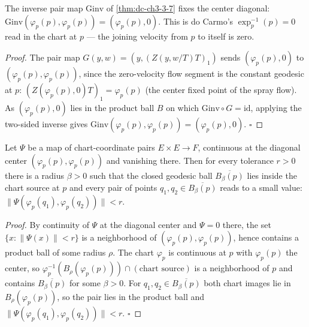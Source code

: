 \begin{lemma}
  \label{lem:dc-ch3-4-2-invdiagonal}
  \leanok
  The inverse pair map $\mathrm{Ginv}$ of \cref{thm:dc-ch3-3-7} fixes the center
  diagonal: $\mathrm{Ginv}(\varphi_p(p),\varphi_p(p))=(\varphi_p(p),0)$. This is
  do Carmo's $\exp_p^{-1}(p)=0$ read in the chart at $p$ — the joining velocity
  from $p$ to itself is zero.
\end{lemma}
\begin{proof}
  \leanok
  The pair map $G(y,w)=(y,(Z(y,w/T)T)_1)$ sends $(\varphi_p(p),0)$ to
  $(\varphi_p(p),\varphi_p(p))$, since the zero-velocity flow segment is the
  constant geodesic at $p$: $(Z(\varphi_p(p),0)T)_1=\varphi_p(p)$ (the center
  fixed point of the spray flow). As $(\varphi_p(p),0)$ lies in the product ball
  $B$ on which $\mathrm{Ginv}\circ G=\mathrm{id}$, applying the two-sided inverse
  gives $\mathrm{Ginv}(\varphi_p(p),\varphi_p(p))=(\varphi_p(p),0)$. $\square$
\end{proof}

\begin{lemma}
  \label{lem:dc-ch3-4-2-pairsmall}
  \leanok
  Let $\Psi$ be a map of chart-coordinate pairs $E\times E\to F$, continuous at the
  diagonal center $(\varphi_p(p),\varphi_p(p))$ and vanishing there. Then for every
  tolerance $r>0$ there is a radius $\beta>0$ such that the closed geodesic ball
  $\overline{B_\beta(p)}$ lies inside the chart source at $p$ and every pair of
  points $q_1,q_2\in\overline{B_\beta(p)}$ reads to a small value:
  $\|\Psi(\varphi_p(q_1),\varphi_p(q_2))\|<r$.
\end{lemma}
\begin{proof}
  \leanok
  By continuity of $\Psi$ at the diagonal center and $\Psi=0$ there, the set
  $\{x:\|\Psi(x)\|<r\}$ is a neighborhood of $(\varphi_p(p),\varphi_p(p))$, hence
  contains a product ball of some radius $\rho$. The chart $\varphi_p$ is
  continuous at $p$ with $\varphi_p(p)$ the center, so
  $\varphi_p^{-1}(B_\rho(\varphi_p(p)))\cap(\text{chart source})$ is a neighborhood
  of $p$ and contains $\overline{B_\beta(p)}$ for some $\beta>0$. For
  $q_1,q_2\in\overline{B_\beta(p)}$ both chart images lie in $B_\rho(\varphi_p(p))$,
  so the pair lies in the product ball and $\|\Psi(\varphi_p(q_1),\varphi_p(q_2))\|<r$.
  $\square$
\end{proof}

